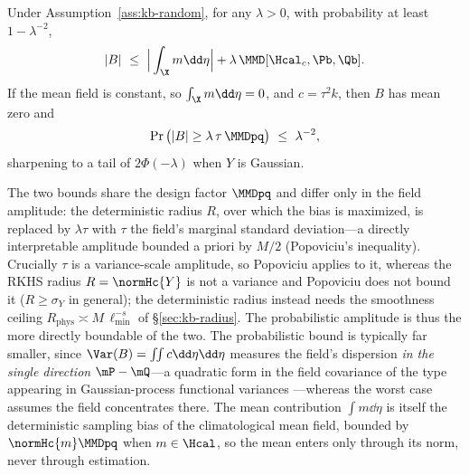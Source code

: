 \begin{corollary}
\label{cor:kb-cheb}
Under Assumption~\ref{ass:kb-random}, for any $\lambda>0$, with probability at least
$1-\lambda^{-2}$,
\[
  |B|\ \le\ \Big|\int_\X m\dd\eta\Big|+\lambda\,\MMD[\Hcal_c,\Pb,\Qb].
\]
If the mean field is constant, so $\int_\X m\dd\eta=0$, and $c=\tau^2 k$, then $B$ has
mean zero and
\[
  \Pr\big(|B|\ge\lambda\,\tau\,\MMDpq\big)\ \le\ \lambda^{-2},
\]
sharpening to a tail of $2\Phi(-\lambda)$ when $Y$ is Gaussian.
\end{corollary}

\begin{remark}
\label{rem:kb-random}
The two bounds share the design factor $\MMDpq$ and differ only in the field
amplitude: the deterministic radius $R$, over which the bias is maximized, is
replaced by $\lambda\tau$ with $\tau$ the field's marginal standard deviation---a
directly interpretable amplitude bounded a priori by $M/2$ (Popoviciu's
inequality). Crucially $\tau$ is a variance-scale amplitude, so Popoviciu applies
to it, whereas the RKHS radius $R=\normHc{Y}$ is not a variance and Popoviciu does
not bound it ($R\ge\sigma_Y$ in general); the deterministic radius instead needs
the smoothness ceiling $R_{\mathrm{phys}}\asymp M\,\ell_{\min}^{-s}$ of
\S\ref{sec:kb-radius}. The probabilistic amplitude is thus the more directly
boundable of the two. The probabilistic bound is typically far smaller, since
$\Var(B)=\iint c\dd\eta\dd\eta$ measures the field's dispersion \emph{in the single
direction} $\mP-\mQ$---a quadratic form in the field covariance of the type
appearing in Gaussian-process functional variances \citep{baugh2022}---whereas the
worst case assumes the field concentrates there. The mean contribution
$\int m\dd\eta$ is itself the deterministic sampling bias of the climatological
mean field, bounded by $\normHc{m}\MMDpq$ when $m\in\Hcal$, so the mean enters only
through its norm, never through estimation.
\end{remark}

